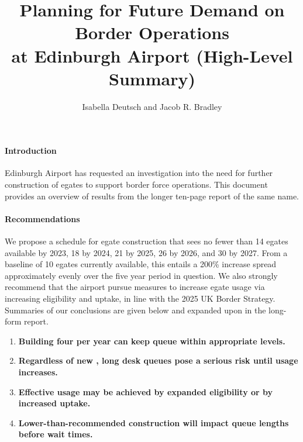 \documentclass[10pt]{article}
\title{Planning for Future Demand on Border Operations\\ at Edinburgh Airport (High-Level Summary)}
\author{Isabella Deutsch and Jacob R. Bradley}
\date{}
\begin{document}
\maketitle

\vspace{-15pt}
\paragraph{Introduction}
Edinburgh Airport has requested an investigation into the need for further construction of \glspl{egate} to support border force operations. This document provides an overview of results from the longer ten-page report of the same name. 

\paragraph{Recommendations}
We propose a schedule for \gls{egate} construction that sees no fewer than 14 \glspl{egate} available by 2023, 18 by 2024, 21 by 2025, 26 by 2026, and 30 by 2027. From a baseline of 10 \glspl{egate} currently available, this entails a 200\% increase spread approximately evenly over the five year period in question. We also strongly recommend that the airport pursue measures to increase \gls{egate} usage via increasing eligibility and uptake, in line with the 2025 UK Border Strategy. Summaries of our conclusions are given below and expanded upon in the long-form report.
\begin{tcolorbox}[
colframe=edi-dark-purple,
colback=edi-light-purple,
fonttitle=\bfseries,
title = {Summary of Recommendations and Conclusions}]
\begin{enumerate}

    \item \textbf{Building four  per year can keep  queue  within appropriate levels.}\\
    \item \textbf{Regardless of new , long desk queues pose a serious risk until  usage increases.}\\
    \item \textbf{Effective  usage may be achieved by expanded eligibility or by increased uptake.}\\
    \item \textbf{Lower-than-recommended  construction will impact queue lengths before wait times.}\\
\end{enumerate}
\end{tcolorbox}
\end{document}
